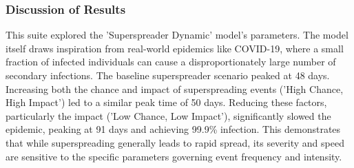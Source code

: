 \documentclass[12pt]{article}
\begin{document}
\begin{table}[H]
\centering
\caption{Summary Metrics for Experiment Suite 4: Superspreader Phenomenon}
\label{tab:exp4_metrics}
\end{table}

\subsubsection*{Discussion of Results}
This suite explored the 'Superspreader Dynamic' model's parameters. The model itself draws inspiration from real-world epidemics like COVID-19, where a small fraction of infected individuals can cause a disproportionately large number of secondary infections. The baseline superspreader scenario peaked at 48 days. Increasing both the chance and impact of superspreading events ('High Chance, High Impact') led to a similar peak time of 50 days. Reducing these factors, particularly the impact ('Low Chance, Low Impact'), significantly slowed the epidemic, peaking at 91 days and achieving 99.9\% infection. This demonstrates that while superspreading generally leads to rapid spread, its severity and speed are sensitive to the specific parameters governing event frequency and intensity.
\end{document}
